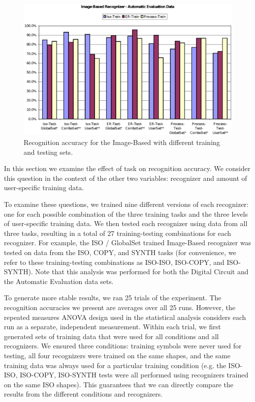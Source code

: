 \documentclass[final,5p,twocolumn]{elsarticle}
\begin{document}
\begin{figure}
\begin{center}
\includegraphics[width=.9\hsize]{ImageRecoAutoChart.eps}
\end{center}
\caption{Recognition accuracy for the Image-Based with different training and testing sets. }
\label{ImgRecoAuto}
\end{figure}

In this section we examine the effect of task on recognition accuracy.
We consider this question in the context of the other two variables: recognizer
and amount of user-specific training data.

To examine these questions, we trained nine different versions of each
recognizer: one for each possible combination of the three training
tasks and the three levels of user-specific training data.  We then
tested each recognizer using data from all three tasks, resulting in a
total of 27 training-testing combinations for each recognizer.  For
example, the ISO / GlobalSet trained Image-Based recognizer was tested
on data from the ISO, COPY, and SYNTH tasks (for convenience, we refer
to these training-testing combinations as ISO-ISO, ISO-COPY, and
ISO-SYNTH). Note that this analysis was performed for both the Digital
Circuit and the Automatic Evaluation data sets. 

To generate more stable results, we ran 25 trials of the experiment.
The recognition accuracies we present are averages over all 25 runs.
However, the repeated measures ANOVA design used in the 
statistical analysis considers each run as a separate, independent measurement.
Within each trial, we first generated sets of training data that were used for 
all conditions and all recognizers.  We ensured three conditions:
training symbols were never used for testing, all four recognizers
were trained on the same shapes, and the same training data was always
used for a particular training condition (e.g. the ISO-ISO, ISO-COPY, ISO-SYNTH
tests were all performed using recognizers trained on the same ISO shapes).
This guarantees that we can directly compare the results from the different
conditions and recognizers.
\end{document}
